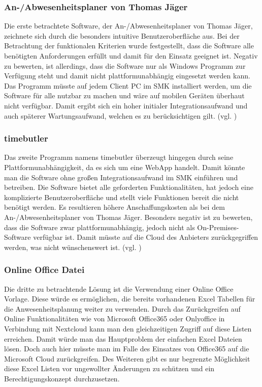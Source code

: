 \subsubsection{An-/Abwesenheitsplaner von Thomas Jäger}
\label{sec:AnAbwesenheitsplaner}
Die erste betrachtete Software, der An-/Abwesenheitsplaner von Thomas Jäger, zeichnete sich durch die besonders intuitive Benutzeroberfläche aus. Bei der Betrachtung der funktionalen Kriterien wurde festgestellt, dass die Software alle benötigten Anforderungen erfüllt und damit für den Einsatz geeignet ist. Negativ zu bewerten, ist allerdings, dass die Software nur als Windows Programm zur Verfügung steht und damit nicht plattformunabhängig eingesetzt werden kann. Das Programm müsste auf jedem Client PC im SMK installiert werden, um die Software für alle nutzbar zu machen und wäre auf mobilen Geräten überhaut nicht verfügbar. Damit ergibt sich ein hoher initialer Integrationsaufwand und auch späterer Wartungsaufwand, welchen es zu berücksichtigen gilt. (vgl. \cite{AnAbwesenPlaner})

\subsubsection{timebutler}
\label{sec:timebutler}
Das zweite Programm namens timebutler überzeugt hingegen durch seine Plattformunabhängigkeit, da es sich um eine WebApp handelt. Damit könnte man die Software ohne großen Integrationsaufwand im SMK einführen und betreiben. Die Software bietet alle geforderten Funktionalitäten, hat jedoch eine komplizierte Benutzeroberfläche und stellt viele Funktionen bereit die nicht benötigt werden. Es resultieren höhere Anschaffungskosten als bei dem An-/Abwesenheitsplaner von Thomas Jäger. Besonders negativ ist zu bewerten, dass die Software zwar plattformunabhängig, jedoch nicht als On-Premises-Software verfügbar ist. Damit müsste auf die Cloud des Anbieters zurückgegriffen werden, was nicht wünschenswert ist. (vgl. \cite{timebutler})

\subsubsection{Online Office Datei}
\label{sec:OnlineOffice}
Die dritte zu betrachtende Lösung ist die Verwendung einer Online Office Vorlage. Diese würde es ermöglichen, die bereits vorhandenen Excel Tabellen für die Anwesenheitsplanung weiter zu verwenden. Durch das Zurückgreifen auf Online Funktionalitäten wie von Microsoft Office365 oder Onlyoffice in Verbindung mit Nextcloud kann man den gleichzeitigen Zugriff auf diese Listen erreichen. Damit würde man das Hauptproblem der einfachen Excel Dateien lösen. Doch auch hier müsste man im Falle des Einsatzes von Office365 auf die Microsoft Cloud zurückgreifen. Des Weiteren gibt es nur begrenzte Möglichkeit diese Excel Listen vor ungewollter Änderungen zu schützen und ein Berechtigungskonzept durchzusetzen.

